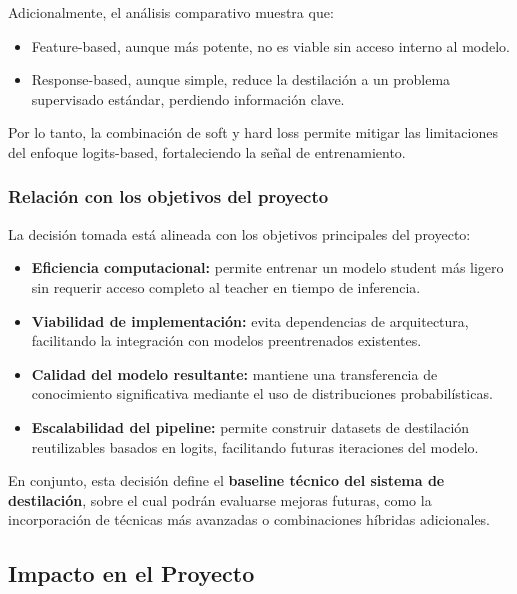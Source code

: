 \documentclass[12pt]{article}
\begin{document}
	Adicionalmente, el análisis comparativo muestra que:
	
	\begin{itemize}
		\item Feature-based, aunque más potente, no es viable sin acceso interno al modelo.
		\item Response-based, aunque simple, reduce la destilación a un problema supervisado estándar, perdiendo información clave.
	\end{itemize}
	
	Por lo tanto, la combinación de soft y hard loss permite mitigar las limitaciones del enfoque logits-based, fortaleciendo la señal de entrenamiento.
	
	\subsubsection{Relación con los objetivos del proyecto}
	
	La decisión tomada está alineada con los objetivos principales del proyecto:
	
	\begin{itemize}
		\item \textbf{Eficiencia computacional:} permite entrenar un modelo student más ligero sin requerir acceso completo al teacher en tiempo de inferencia.
		
		\item \textbf{Viabilidad de implementación:} evita dependencias de arquitectura, facilitando la integración con modelos preentrenados existentes.
		
		\item \textbf{Calidad del modelo resultante:} mantiene una transferencia de conocimiento significativa mediante el uso de distribuciones probabilísticas.
		
		\item \textbf{Escalabilidad del pipeline:} permite construir datasets de destilación reutilizables basados en logits, facilitando futuras iteraciones del modelo.
	\end{itemize}
	
	En conjunto, esta decisión define el \textbf{baseline técnico del sistema de destilación}, sobre el cual podrán evaluarse mejoras futuras, como la incorporación de técnicas más avanzadas o combinaciones híbridas adicionales.
	
	\subsection{Impacto en el Proyecto}
	
\end{document}
